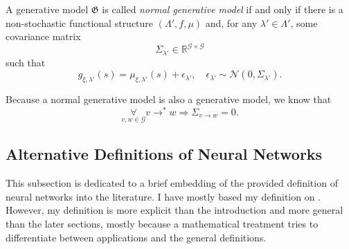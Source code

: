 \documentclass[a4paper,11pt]{report}
\begin{document}
\begin{Def}
A generative model $\mathfrak{G}$ is called \emph{normal generative model} if and only if there is a non-stochastic functional structure $(\Lambda',f,\mu)$ and, for any $\lambda'\in\Lambda'$, some covariance matrix
\[
\Sigma_{\lambda'}\in\mathbb{R}^{\mathcal{G}\times\mathcal{G}}
\]
such that
\[
g_{\xi,\lambda'}(s)=\mu_{\xi,\lambda'}(s)+\epsilon_{\lambda'},
\quad
\epsilon_{\lambda'}\sim\mathcal{N}(0,\Sigma_{\lambda'}).
\]
\end{Def}

\begin{Par}
Because a normal generative model is also a generative model, we know that
\[
\underset{v,w\in\mathcal{G}}{\forall}v\to^* w\Rightarrow\Sigma_{v\to w}=0.
\]
\end{Par}

\subsection{Alternative Definitions of Neural Networks}\label{subsec:theory-structure-other}

\begin{Par}
This subsection is dedicated to a brief embedding of the provided definition of neural networks into the literature. I have mostly based my definition on \cite{Rojas1996}. However, my definition is more explicit than the introduction and more general than the later sections, mostly because a mathematical treatment tries to differentiate between applications and the general definitions.
\end{Par}
\end{document}
